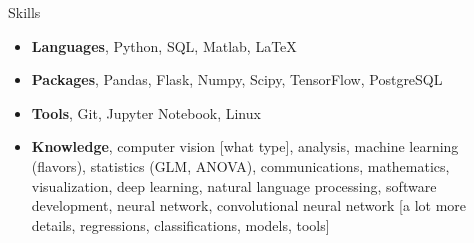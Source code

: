 \documentclass{resume} %
\begin{document}

\begin{rSection}{Skills}
	\begin{itemize}
		\item {\bf Languages}{, Python, SQL, Matlab, LaTeX}
		\item {\bf Packages}{, Pandas, Flask, Numpy, Scipy, TensorFlow, PostgreSQL}
		\item {\bf Tools}{, Git, Jupyter Notebook, Linux}
		\item {\bf Knowledge}{, computer vision [what type], analysis, machine learning (flavors), statistics (GLM, ANOVA), communications, mathematics, visualization, deep learning, natural language processing, software development, neural network, convolutional neural network [a lot more details, regressions, classifications, models, tools]}
		
	\end{itemize}
\end{rSection}
\end{document}
